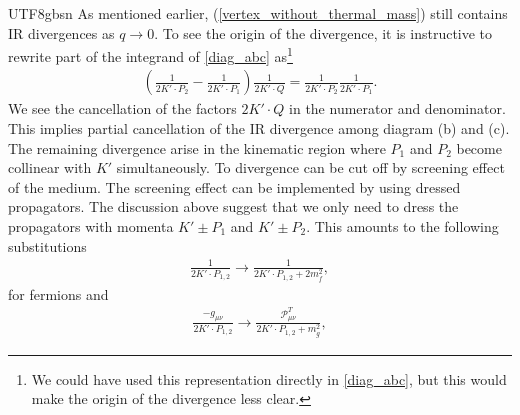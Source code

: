 \documentclass[11pt]{article}\def\baselinestretch{1.4}
\def\({\left(}
\def\){\right)}
\begin{document}
\begin{CJK}{UTF8}{gbsn}
As mentioned earlier, (\ref{vertex_without_thermal_mass}) still contains IR divergences as $q\to0$. To see the origin of the divergence, it is instructive to rewrite part of the integrand of \eqref{diag_abc} as\footnote{We could have used this representation directly in \eqref{diag_abc}, but this would make the origin of the divergence less clear.}
\begin{align}
\(\frac{1}{2K'\cdot P_2}-\frac{1}{2K'\cdot P_1}\)\frac{1}{2K'\cdot Q}=\frac{1}{2K'\cdot P_2}\frac{1}{2K'\cdot P_1}.
\end{align}
We see the cancellation of the factors $2K'\cdot Q$ in the numerator and denominator. This implies partial cancellation of the IR divergence among diagram (b) and (c). The remaining divergence arise in the kinematic region where $P_1$ and $P_2$ become collinear with $K'$ simultaneously. To divergence can be cut off by screening effect of the medium. The screening effect can be implemented by using dressed propagators. The discussion above suggest that we only need to dress the propagators with momenta $K'\pm P_1$ and $K'\pm P_2$. This amounts to the following substitutions \cite{le2000thermal}
\begin{align}
\frac{1}{2K'\cdot P_{1,2}} \to \frac{1}{2K'\cdot P_{1,2}+2m_f^2}, \label{substitute_1}
\end{align}
for fermions and
\begin{align}
\frac{-g_{\mu \nu }}{2K'\cdot P_{1,2}} \to \frac{\mathcal{P}^T_{\mu \nu }}{2K'\cdot P_{1,2}+m_g^2}, \label{substitute_2}

\end{align}
\end{CJK}
\end{document}
